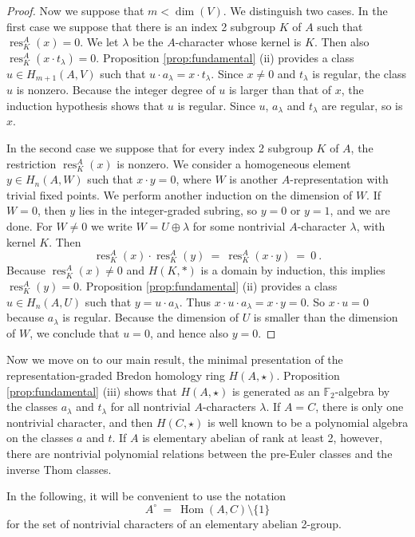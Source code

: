 \documentclass{amsart}[12pt]
\DeclareMathOperator{\Hom}{Hom}
\DeclareMathOperator{\res}{res}
\newcommand{\mF}{{\mathbb F}}
\numberwithin{equation}{section}
\theoremstyle{definition}
\begin{document}
\begin{proof}
  Now we suppose that $m<\dim(V)$. We distinguish two cases.
  In the first case we suppose that there is an index 2 subgroup $K$ of $A$
  such that $\res^A_K(x)=0$. We let $\lambda$ be the $A$-character whose kernel is $K$.
  Then also $\res^A_K(x\cdot t_\lambda)=0$.
  Proposition \ref{prop:fundamental} (ii)
  provides a class $u\in H_{m+1}(A,V)$ such that $u\cdot a_\lambda=x\cdot t_\lambda$.
  Since $x\ne 0$ and $t_\lambda$ is regular, the class $u$ is nonzero.
  Because the integer degree of $u$ is larger than that of $x$, 
  the induction hypothesis shows that $u$ is regular. Since $u$, $a_\lambda$ and $t_\lambda$
  are regular, so is $x$.

  In the second case we suppose that for every index 2 subgroup $K$ of $A$,
  the restriction $\res^A_K(x)$ is nonzero.
  We consider a homogeneous element $y\in H_n(A,W)$ such that $x\cdot y=0$,
  where $W$ is another $A$-representation with trivial fixed points.
  We perform another induction on the dimension of $W$.
  If $W=0$, then $y$ lies in the integer-graded subring, so $y=0$ or $y=1$, and we are done.
  For $W\ne 0$ we write $W=U\oplus\lambda$ for some nontrivial $A$-character $\lambda$,
  with kernel $K$. Then
  \[ \res^A_K(x)\cdot \res^A_K(y)\ = \ \res^A_K(x\cdot y)\ = \ 0\ . \]
  Because $\res^A_K(x)\ne 0$ and $H(K,\ast)$ is a domain by induction,
  this implies $\res^A_K(y)=0$.
  Proposition \ref{prop:fundamental} (ii) provides
  a class $u\in H_n(A,U)$ such that $y=u\cdot a_\lambda$.
  Thus $x\cdot u\cdot a_\lambda=x\cdot y=0$.
  So $x\cdot u=0$ because $a_\lambda$ is regular.
  Because the dimension of $U$ is smaller than the dimension of $W$,
  we conclude that $u=0$, and hence also $y=0$.
\end{proof}

Now we move on to our main result, the minimal presentation
of the representation-graded Bredon homology ring $H(A,\star)$.
Proposition \ref{prop:fundamental} (iii) shows that $H(A,\star)$
is generated as an $\mF_2$-algebra
by the classes $a_\lambda$ and $t_\lambda$ for all nontrivial $A$-characters $\lambda$.
If $A=C$, there is only one nontrivial character, and
then $H(C,\star)$ is well known to be a polynomial algebra
on the classes $a$ and $t$.
If $A$ is elementary abelian of rank at least 2,
however, there are nontrivial polynomial relations between the
pre-Euler classes and the inverse Thom classes.

In the following, it will be convenient to use the notation
\[ A^\circ \ = \ \Hom(A,C)\setminus\{1\} \]
for the set of nontrivial characters of an elementary abelian 2-group.
\end{document}
